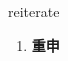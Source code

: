 
\begin{frame}
{\huge reiterate}
\begin{center}
\begin{enumerate}\Large
  \item \textbf{重申}
\end{enumerate}
\end{center}
\end{frame}
